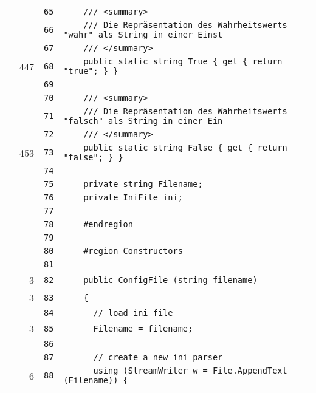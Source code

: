 \documentclass[a4paper,10pt]{article}
\begin{document}
\begin{longtable}[l]{lrrl}
\cellcolor{gray} &  & \verb~65~ & \verb~    /// <summary>~\\
\cellcolor{gray} &  & \verb~66~ & \verb~    /// Die Repräsentation des Wahrheitswerts "wahr" als String in einer Einst~\\
\cellcolor{gray} &  & \verb~67~ & \verb~    /// </summary>~\\
\cellcolor{green} & 447 & \verb~68~ & \verb~    public static string True { get { return "true"; } }~\\
\cellcolor{gray} &  & \verb~69~ & \verb~~\\
\cellcolor{gray} &  & \verb~70~ & \verb~    /// <summary>~\\
\cellcolor{gray} &  & \verb~71~ & \verb~    /// Die Repräsentation des Wahrheitswerts "falsch" als String in einer Ein~\\
\cellcolor{gray} &  & \verb~72~ & \verb~    /// </summary>~\\
\cellcolor{green} & 453 & \verb~73~ & \verb~    public static string False { get { return "false"; } }~\\
\cellcolor{gray} &  & \verb~74~ & \verb~~\\
\cellcolor{gray} &  & \verb~75~ & \verb~    private string Filename;~\\
\cellcolor{gray} &  & \verb~76~ & \verb~    private IniFile ini;~\\
\cellcolor{gray} &  & \verb~77~ & \verb~~\\
\cellcolor{gray} &  & \verb~78~ & \verb~    #endregion~\\
\cellcolor{gray} &  & \verb~79~ & \verb~~\\
\cellcolor{gray} &  & \verb~80~ & \verb~    #region Constructors~\\
\cellcolor{gray} &  & \verb~81~ & \verb~~\\
\cellcolor{green} & 3 & \verb~82~ & \verb~    public ConfigFile (string filename)~\\
\cellcolor{green} & 3 & \verb~83~ & \verb~    {~\\
\cellcolor{gray} &  & \verb~84~ & \verb~      // load ini file~\\
\cellcolor{green} & 3 & \verb~85~ & \verb~      Filename = filename;~\\
\cellcolor{gray} &  & \verb~86~ & \verb~~\\
\cellcolor{gray} &  & \verb~87~ & \verb~      // create a new ini parser~\\
\cellcolor{green} & 6 & \verb~88~ & \verb~      using (StreamWriter w = File.AppendText (Filename)) {~\\

\end{longtable}
\end{document}

